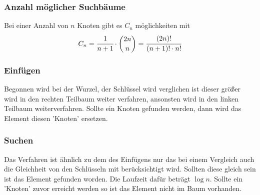 \documentclass[10pt,a4paper]{article}
\begin{document}
\begin{multicols*}{4}
\subsubsection{Anzahl möglicher Suchbäume}
Bei einer Anzahl von \(n\) Knoten gibt es \(C_{n}\) möglichkeiten mit
\[C_{n} = \cfrac{1}{n+1} \cdot \binom{2n}{n} = \cfrac{(2n)!}{(n+1)! \cdot n!}\]

\subsubsection{Einfügen}
Begonnen wird bei der Wurzel, der Schlüssel wird verglichen ist dieser größer wird in den rechten Teilbaum weiter
verfahren, ansonsten wird in den linken Teilbaum weiterverfahren. Sollte ein \NIL Knoten gefunden werden,
dann wird das Element diesen 'Knoten' ersetzen. \\


\subsubsection{Suchen}
Das Verfahren ist ähnlich zu dem des Einfügens nur das bei einem Vergleich auch die Gleichheit von den Schlüsseln
mit berücksichtigt wird. Sollten diese gleich sein ist das Element gefunden worden. Die Laufzeit dafür beträgt
\(\log n\). Sollte ein \NIL 'Knoten' zuvor erreicht werden so ist das Element nicht im Baum vorhanden. \\



\end{multicols*}
\end{document}
